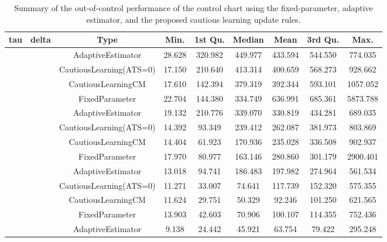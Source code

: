 \begin{table}[!h]

\caption{Summary of the out-of-control performance of the control chart using the fixed-parameter, adaptive estimator, and the proposed cautious learning update rules.}
\centering
\begin{tabular}[t]{ccccccccc}
\toprule
tau & delta & Type & Min. & 1st Qu. & Median & Mean & 3rd Qu. & Max.\\
\midrule
 &  & AdaptiveEstimator & 28.628 & 320.982 & 449.977 & 433.594 & 544.550 & 774.035\\

 &  & CautiousLearning(ATS=0) & 17.150 & 210.640 & 413.314 & 400.659 & 568.273 & 928.662\\

 &  & CautiousLearningCM & 17.610 & 142.394 & 379.319 & 392.344 & 593.101 & 1057.052\\

 & \multirow[t]{-4}{*}{\centering\arraybackslash 0.25} & FixedParameter & 22.704 & 144.380 & 334.749 & 636.991 & 685.361 & 5873.788\\
\cmidrule{2-9}
 &  & AdaptiveEstimator & 19.132 & 210.776 & 339.070 & 330.819 & 434.281 & 689.035\\

 &  & CautiousLearning(ATS=0) & 14.392 & 93.349 & 239.412 & 262.087 & 381.973 & 803.869\\

 &  & CautiousLearningCM & 14.404 & 61.923 & 170.936 & 235.028 & 336.508 & 902.937\\

 & \multirow[t]{-4}{*}{\centering\arraybackslash 0.35} & FixedParameter & 17.970 & 80.977 & 163.146 & 280.860 & 301.179 & 2900.401\\
\cmidrule{2-9}
 &  & AdaptiveEstimator & 13.018 & 94.741 & 186.483 & 197.982 & 274.964 & 561.534\\

 &  & CautiousLearning(ATS=0) & 11.271 & 33.007 & 74.641 & 117.739 & 152.320 & 575.355\\

 &  & CautiousLearningCM & 11.624 & 29.751 & 50.329 & 92.246 & 101.250 & 621.565\\

 & \multirow[t]{-4}{*}{\centering\arraybackslash 0.50} & FixedParameter & 13.903 & 42.603 & 70.906 & 100.107 & 114.355 & 752.436\\
\cmidrule{2-9}
 &  & AdaptiveEstimator & 9.138 & 24.442 & 45.921 & 63.754 & 79.422 & 295.248\\


\end{tabular}
\end{table}
